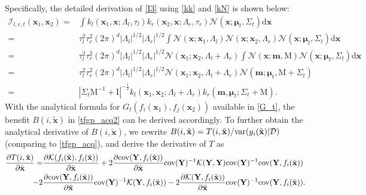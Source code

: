 \documentclass[11pt]{article}
\begin{document}
Specifically, the detailed derivation of \eqref{I3} using \eqref{kk} and \eqref{kN} is shown below:
\begin{subequations}
\begin{align}
    \mathcal{I}_{l,r,t}(\mathbf{x}_1, \mathbf{x}_2) = &
    \int k_l(\mathbf{x}_1, \mathbf{x}; \Lambda_l, \tau_l)  k_r(\mathbf{x}_2, \mathbf{x}; \Lambda_r, \tau_r) 
    \mathcal{N}(\mathbf{x};\mathbf{\mu}_t, \Sigma_t) \mathrm{d} \mathbf{x} 
\\
    = &  \tau_l^2 \tau_r^2 (2\pi)^d |\Lambda_l|^{1/2}|\Lambda_r|^{1/2} \int
    \mathcal{N}(\mathbf{x}; \mathbf{x}_1, \Lambda_l) \mathcal{N}(\mathbf{x}; \mathbf{x}_2, \Lambda_r) \mathcal{N}(\mathbf{x};\mathbf{\mu}_t, \Sigma_t) \mathrm{d} \mathbf{x} 
\\
    = &  \tau_l^2 \tau_r^2 (2\pi)^d |\Lambda_l|^{1/2}|\Lambda_r|^{1/2}
    \mathcal{N}(\mathbf{x}_1; \mathbf{x}_2, \Lambda_l + \Lambda_r) \int \mathcal{N}(\mathbf{x}; \mathbf{m}, \mathrm{M}) \mathcal{N}(\mathbf{x};\mathbf{\mu}_t, \Sigma_t) \mathrm{d} \mathbf{x}
\\
    = & \tau_l^2 \tau_r^2 (2\pi)^d |\Lambda_l|^{1/2}|\Lambda_r|^{1/2}
    \mathcal{N}(\mathbf{x}_1; \mathbf{x}_2, \Lambda_l + \Lambda_r)  \mathcal{N}(\mathbf{m};\mathbf{\mu}_t, \mathrm{M} + \Sigma_t) 
\\
     = & |\Sigma_t \mathrm{M}^{-1} + \mathrm{I}|^{-\frac{1}{2}}  k_l(\mathbf{x}_1, \mathbf{x}_2;\Lambda_l+\Lambda_r)
    k_r(\mathbf{m},\mathbf{\mu}_t; \Sigma_t + \mathrm{M}).
\end{align}
\end{subequations}
With the analytical formula for $G_t(f_i(\mathbf{x}_1), f_j(\mathbf{x}_2))$ available in \eqref{G_t}, the benefit $B(i,\tilde{\mathbf{x}})$ in \eqref{tfgp_acq2} can be derived accordingly. To further obtain the analytical derivative of $B(i,\tilde{\mathbf{x}})$, we rewrite $B(i,\tilde{\mathbf{x}}) = T(i,\tilde{\mathbf{x}})/ {\rm{var}}(y_i(\tilde{\mathbf{x}})|\mathcal{D})$ (comparing to \eqref{tfgp_acq}), and derive the derivative of $T$ as
\begin{align}
        \frac{\partial T(i, \tilde{\mathbf{x}})}{\partial \tilde{\mathbf{x}}} =  &\frac{\partial \mathcal{K}(f_i(\tilde{\mathbf{x}}), f_i(\tilde{\mathbf{x}})) }{ \partial \tilde{\mathbf{x}}} + 2 \frac{\partial {\rm{cov}}(\mathbf{Y}, f_i(\tilde{\mathbf{x}}))}{\partial \tilde{\mathbf{x}}}  {\rm{cov}}(\mathbf{Y})^{-1}  \mathcal{K}(\mathbf{Y},\mathbf{Y})  {\rm{cov}}(\mathbf{Y})^{-1}  {\rm{cov}}(\mathbf{Y},f_i(\tilde{\mathbf{x}}))
\nonumber \\
        - 2 &\frac{\partial {\rm{cov}}(\mathbf{Y},f_i(\tilde{\mathbf{x}}))}{\partial \tilde{\mathbf{x}}}{\rm{cov}}(\mathbf{Y})^{-1} \mathcal{K}(\mathbf{Y}, f_i(\tilde{\mathbf{x}})) 
        - 2 \frac{\partial \mathcal{K}(\mathbf{Y}, f_i(\tilde{\mathbf{x}}))}{\partial \tilde{\mathbf{x}}} {\rm{cov}}(\mathbf{Y})^{-1} {\rm{cov}}(\mathbf{Y}, f_i(\tilde{\mathbf{x}})).
\label{T_deriv}
\end{align}
\end{document}
